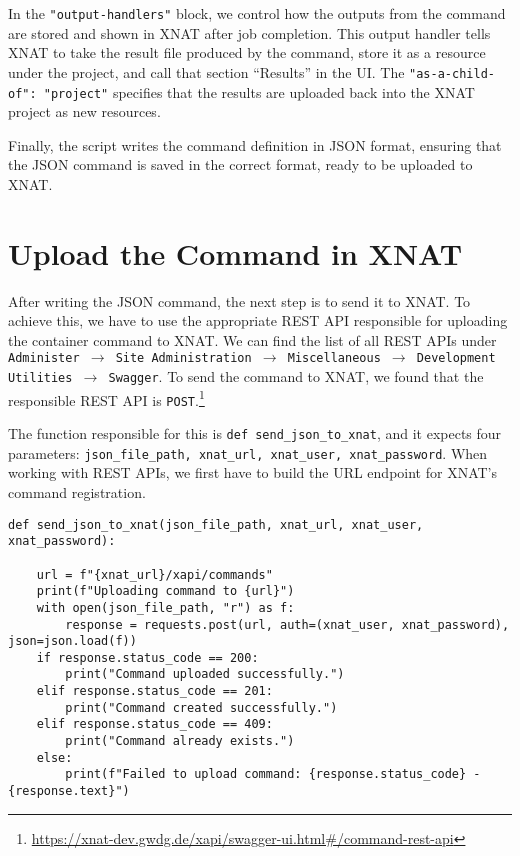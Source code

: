 In the \texttt{"output-handlers"} block, we control how the outputs from the command are stored and shown in XNAT after job completion. This output handler tells XNAT to take the result file produced by the command, store it as a resource under the project, and call that section ``Results'' in the UI. The \texttt{"as-a-child-of": "project"} specifies that the results are uploaded back into the XNAT project as new resources.

Finally, the script writes the command definition in JSON format, ensuring that the JSON command is saved in the correct format, ready to be uploaded to XNAT.

\section{Upload the Command in XNAT}

After writing the JSON command, the next step is to send it to XNAT. To achieve this, we have to use the appropriate REST API responsible for uploading the container command to XNAT.
We can find the list of all REST APIs under \texttt{Administer $\rightarrow$ Site Administration $\rightarrow$ Miscellaneous $\rightarrow$ Development Utilities $\rightarrow$ Swagger}.
To send the command to XNAT, we found that the responsible REST API is \texttt{POST}.\footnote{\url{https://xnat-dev.gwdg.de/xapi/swagger-ui.html\#/command-rest-api}}

The function responsible for this is \texttt{def send\_json\_to\_xnat}, and it expects four parameters: \texttt{json\_file\_path, xnat\_url, xnat\_user, xnat\_password}. When working with REST APIs, we first have to build the URL endpoint for XNAT’s command registration.
 
\begin{lstlisting}
def send_json_to_xnat(json_file_path, xnat_url, xnat_user, xnat_password): 

    url = f"{xnat_url}/xapi/commands"
    print(f"Uploading command to {url}")
    with open(json_file_path, "r") as f:
        response = requests.post(url, auth=(xnat_user, xnat_password), json=json.load(f))
    if response.status_code == 200:
        print("Command uploaded successfully.")
    elif response.status_code == 201:
        print("Command created successfully.")
    elif response.status_code == 409:
        print("Command already exists.")
    else:
        print(f"Failed to upload command: {response.status_code} - {response.text}")
\end{lstlisting}

